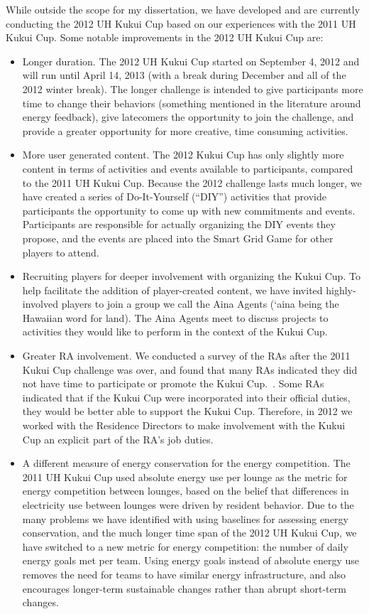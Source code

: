 While outside the scope for my dissertation, we have developed and are currently conducting the 2012 UH Kukui Cup based on our experiences with the 2011 UH Kukui Cup. Some notable improvements in the 2012 UH Kukui Cup are:

\begin{itemize}
	\item Longer duration. The 2012 UH Kukui Cup started on September 4, 2012 and will run until April 14, 2013 (with a break during December and all of the 2012 winter break). The longer challenge is intended to give participants more time to change their behaviors (something mentioned in the literature around energy feedback), give latecomers the opportunity to join the challenge, and provide a greater opportunity for more creative, time consuming activities.
	\item More user generated content. The 2012 Kukui Cup has only slightly more content in terms of activities and events available to participants, compared to the 2011 UH Kukui Cup. Because the 2012 challenge lasts much longer, we have created a series of Do-It-Yourself (``DIY'') activities that provide participants the opportunity to come up with new commitments and events. Participants are responsible for actually organizing the DIY events they propose, and the events are placed into the Smart Grid Game for other players to attend.
	\item Recruiting players for deeper involvement with organizing the Kukui Cup. To help facilitate the addition of player-created content, we have invited highly-involved players to join a group we call the Aina Agents (`aina being the Hawaiian word for land). The Aina Agents meet to discuss projects to activities they would like to perform in the context of the Kukui Cup.
	\item Greater RA involvement. We conducted a survey of the RAs after the 2011 Kukui Cup challenge was over, and found that many RAs indicated they did not have time to participate or promote the Kukui Cup.~\cite{csdl2-11-08}. Some RAs indicated that if the Kukui Cup were incorporated into their official duties, they would be better able to support the Kukui Cup. Therefore, in 2012 we worked with the Residence Directors to make involvement with the Kukui Cup an explicit part of the RA's job duties.
	\item A different measure of energy conservation for the energy competition. The 2011 UH Kukui Cup used absolute energy use per lounge as the metric for energy competition between lounges, based on the belief that differences in electricity use between lounges were driven by resident behavior. Due to the many problems we have identified with using baselines for assessing energy conservation, and the much longer time span of the 2012 UH Kukui Cup, we have switched to a new metric for energy competition: the number of daily energy goals met per team. Using energy goals instead of absolute energy use removes the need for teams to have similar energy infrastructure, and also encourages longer-term sustainable changes rather than abrupt short-term changes.

\end{itemize}

